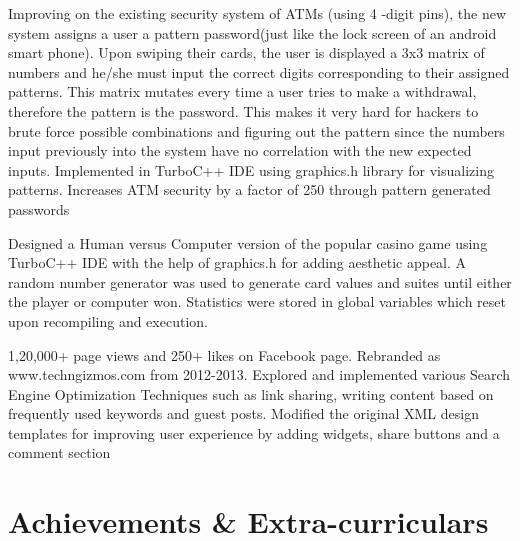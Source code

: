 \documentclass[11pt,a4paper,roman]{moderncv}        %
\begin{document}
Improving on the existing security system of ATMs (using 4 -digit pins), the new system assigns a user a pattern password(just like the lock screen of an android smart phone). Upon swiping their cards, the user is displayed a 3x3 matrix of numbers and he/she must input the correct digits corresponding to their assigned patterns. This matrix mutates every time a user tries to make a withdrawal, therefore the pattern is the password. This makes it very hard for hackers to brute force possible combinations and figuring out the pattern since the numbers input previously into the system have no correlation with the new expected inputs. Implemented in TurboC++ IDE using graphics.h library for visualizing patterns. Increases ATM security by a factor of 250 through pattern generated passwords
\newline
\newline

Designed a Human versus Computer version of the popular casino game using TurboC++ IDE with the help of graphics.h for adding aesthetic appeal. A random number generator was used to generate card values and suites until either the player or computer won. Statistics were stored in global variables which reset upon recompiling and execution. 

1,20,000+ page views and 250+ likes on Facebook page. Rebranded as www.techngizmos.com from 2012-2013. Explored and implemented various Search Engine Optimization Techniques such as link sharing, writing content based on frequently used keywords and guest posts. Modified the original XML design templates for improving user experience by adding widgets, share buttons and a comment section 



\section{\small{Achievements \& Extra-curriculars}}
\end{document}
